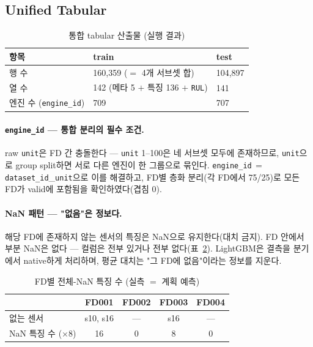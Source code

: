 \documentclass[11pt]{article}
\begin{document}
\subsection{Unified Tabular}

\begin{table}[H]
\centering
\caption{통합 tabular 산출물 (실행 결과)}
\label{tab:uni}
\begin{tabular}{lll}
\toprule
항목 & train & test \\
\midrule
행 수 & 160{,}359 ($=$ 4개 서브셋 합) & 104{,}897 \\
열 수 & 142 (메타 5 $+$ 특징 136 $+$ \texttt{RUL}) & 141 \\
엔진 수 (\texttt{engine\_id}) & 709 & 707 \\
\bottomrule
\end{tabular}
\end{table}

\paragraph{\texttt{engine\_id} — 통합 분리의 필수 조건.}
raw \texttt{unit}은 FD 간 충돌한다 — \texttt{unit} 1--100은 네 서브셋 모두에 존재하므로, \texttt{unit}으로 group split하면 서로 다른 엔진이 한 그룹으로 묶인다.
\texttt{engine\_id}$\,=\,$\texttt{dataset\_id}\_\texttt{unit}으로 이를 해결하고, FD별 층화 분리(각 FD에서 75/25)로 모든 FD가 valid에 포함됨을 확인하였다(겹침 0).

\paragraph{NaN 패턴 — "없음"은 정보다.}
해당 FD에 존재하지 않는 센서의 특징은 NaN으로 유지한다(대치 금지).
FD 안에서 부분 NaN은 없다 — 컬럼은 전부 있거나 전부 없다(표~\ref{tab:nan}).
LightGBM은 결측을 분기에서 native하게 처리하며, 평균 대치는 "그 FD에 없음"이라는 정보를 지운다.

\begin{table}[H]
\centering
\caption{FD별 전체-NaN 특징 수 (실측 $=$ 계획 예측)}
\label{tab:nan}
\begin{tabular}{lcccc}
\toprule
 & FD001 & FD002 & FD003 & FD004 \\
\midrule
없는 센서 & s10, s16 & — & s16 & — \\
NaN 특징 수 ($\times8$) & 16 & 0 & 8 & 0 \\
\bottomrule
\end{tabular}
\end{table}
\end{document}
